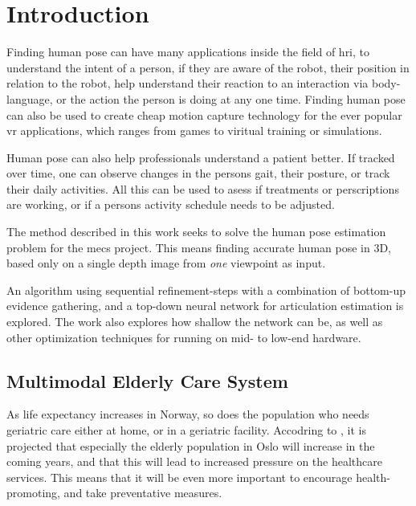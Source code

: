 \chapter{Introduction}








Finding human pose can have many applications inside the field of \gls{hri}, to understand the intent of a person, if they are aware of the robot, their position in relation to the robot, help understand their reaction to an interaction via body-language, or the action the person is doing at any one time. Finding human pose can also be used to create cheap motion capture technology for the ever popular \gls{vr} applications, which ranges from games to viritual training or simulations.

Human pose can also help professionals understand a patient better. If tracked over time, one can observe changes in the persons gait, their posture, or track their daily activities. All this can be used to asess if treatments or perscriptions are working, or if a persons activity schedule needs to be adjusted.

The method described in this work seeks to solve the human pose estimation problem for the \gls{mecs} project. This means finding accurate human pose in 3D, based only on a single depth image from \emph{one} viewpoint as input.

An algorithm using sequential refinement-steps with a combination of bottom-up evidence gathering, and a top-down neural network for articulation estimation is explored. The work also explores how shallow the network can be, as well as other optimization techniques for running on mid- to low-end hardware.
 
\section{Multimodal Elderly Care System}
As life expectancy increases in Norway, so does the population who needs geriatric care either at home, or in a geriatric facility. Accodring to \cite{oslohelsa}, it is projected that especially the elderly population in Oslo will increase in the coming years, and that this will lead to increased pressure on the healthcare services. This means that it will be even more important to encourage health-promoting, and take preventative measures.

